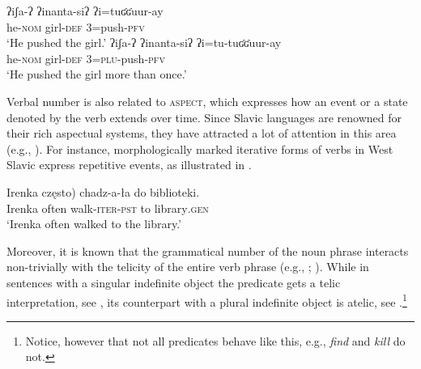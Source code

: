 \documentclass[output=paper]{langscibook}
\begin{document}
\ea\label{doc-wag:ex:pluractionality} \ea \gll ʔiʃa-ʔ ʔinanta-siʔ ʔi=tuʛʛuur-ay\\
he-\textsc{nom} girl-\textsc{def} \textsc{3}=push-\textsc{pfv}\\
\glt `He pushed the girl.'  
\ex \gll ʔiʃa-ʔ ʔinanta-siʔ ʔi=tu-tuʛʛuur-ay\\
he-\textsc{nom} girl-\textsc{def} \textsc{3}=\textsc{plu}-push-\textsc{pfv}\\
\glt `He pushed the girl more than once.' \\ \hfill \citep[Konso, Cushitic;][adapted]{orkaydo2013category}
\z 
\z

\noindent Verbal number is also related to \textsc{aspect}, which expresses how an event or a state denoted by the verb extends over time. Since Slavic languages are renowned for their rich aspectual systems, they have attracted a lot of attention in this area (e.g., \citealt{filip1999aspect, borik2006aspect}). For instance, morphologically marked iterative forms of verbs in West Slavic express repetitive events, as illustrated in .

\ea \gll Irenka \minsp{(} często) chadz-a-ła do biblioteki.\\
Irenka {} often walk-\textsc{iter}-\textsc{pst} to library\textsc{.gen}\\
\glt `Irenka often walked to the library.' \hfill \citep[Polish;][469, adapted]{pinon1997verbs}\label{doc-wag:ex:iterative}
\z

\noindent Moreover, it is known that the grammatical number of the noun phrase interacts non-trivially with the telicity of the entire verb phrase (e.g., \citealt{verkuyl1972compositional, krifka1998origins, de-swart2006aspectual}; ). While in sentences with a singular indefinite object the predicate gets a telic interpretation, see , its counterpart with a plural indefinite object is atelic, see .\footnote{Notice, however that not all predicates behave like this, e.g., \textit{find} and \textit{kill} do not.}

\ea\label{doc-wag:ex:telicity}
\label{doc-wag:ex:telicity-singular} 
\label{doc-wag:ex:telicity-plural} 
\z 
\z 
\end{document}
